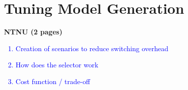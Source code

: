 \section{Tuning Model Generation} \label{tm-generation}
\textbf{NTNU (2 pages)}

\textcolor{blue}{\begin{enumerate}
    \item Creation of scenarios to reduce switching overhead
	\item How does the selector work 
  	\item Cost function / trade-off 
\end{enumerate}
}

